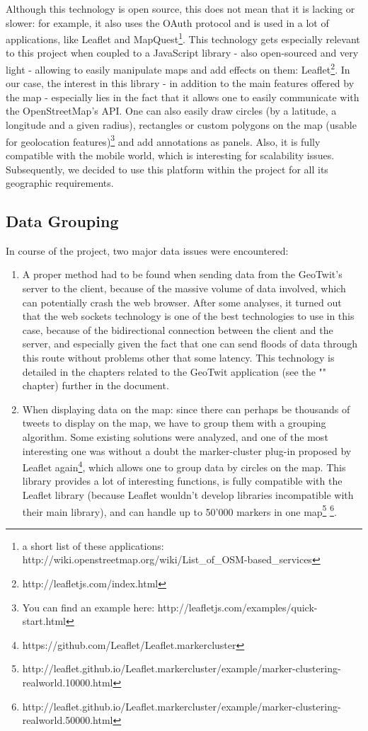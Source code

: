 \documentclass[a4paper,11pt]{report}
\begin{document}
Although this technology is open source, this does not mean that it is lacking or slower: for example, it also uses the OAuth protocol and is used in a lot of applications, like Leaflet and MapQuest\footnote{a short list of these applications: http://wiki.openstreetmap.org/wiki/List\_of\_OSM-based\_services}.
This technology gets especially relevant to this project when coupled to a JavaScript library - also open-sourced and very light - allowing to easily manipulate maps and add effects on them: Leaflet\footnote{http://leafletjs.com/index.html}. In our case, the interest in this library - in addition to the main features offered by the map - especially lies in the fact that it allows one to easily communicate with the OpenStreetMap's API. One can also easily draw circles (by a latitude, a longitude and a given radius), rectangles or custom polygons on the map (usable for geolocation features)\footnote{You can find an example here: http://leafletjs.com/examples/quick-start.html} and add annotations as panels. Also, it is fully compatible with the mobile world, which is interesting for scalability issues.\\

Subsequently, we decided to use this platform within the project for all its geographic requirements.
\newpage

\subsection{Data Grouping}
In course of the project, two major data issues were encountered:
\begin{enumerate}
	\item A proper method had to be found when sending data from the GeoTwit's server to the client, because of the massive volume of data involved, which can potentially crash the web browser. After some analyses, it turned out that the web sockets technology is one of the best technologies to use in this case, because of the bidirectional connection between the client and the server, and especially given the fact that one can send floods of data through this route without problems other that some latency. This technology is detailed in the chapters related to the GeoTwit application (see the "" chapter) further in the document.
	\item When displaying data on the map: since there can perhaps be thousands of tweets to display on the map, we have to group them with a grouping algorithm.
Some existing solutions were analyzed, and one of the most interesting one was without a doubt the marker-cluster plug-in proposed by Leaflet again\footnote{https://github.com/Leaflet/Leaflet.markercluster}, which allows one to group data by circles on the map. This library provides a lot of interesting functions, is fully compatible with the Leaflet library (because Leaflet wouldn't develop libraries incompatible with their main library), and can handle up to 50'000 markers in one map\footnote{http://leaflet.github.io/Leaflet.markercluster/example/marker-clustering-realworld.10000.html} \footnote{http://leaflet.github.io/Leaflet.markercluster/example/marker-clustering-realworld.50000.html}.
\end{enumerate}
\newpage
\end{document}
